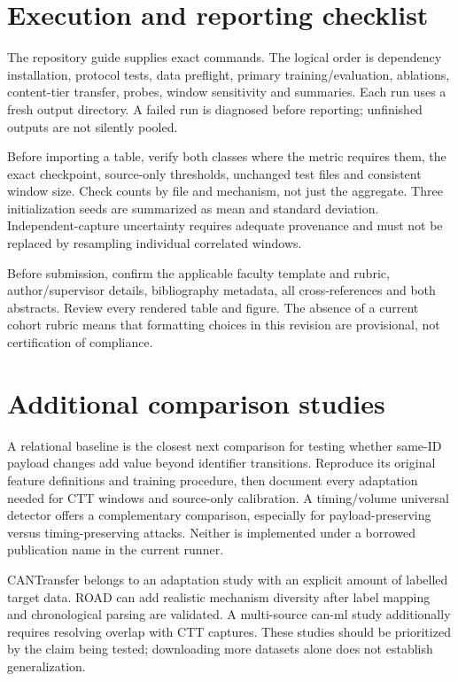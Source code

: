 \documentclass[12pt,a4paper,oneside,openany]{extbook}
\begin{document}
\section{Execution and reporting checklist}
The repository guide supplies exact commands. The logical order is dependency installation, protocol tests, data preflight, primary training/evaluation, ablations, content-tier transfer, probes, window sensitivity and summaries. Each run uses a fresh output directory. A failed run is diagnosed before reporting; unfinished outputs are not silently pooled.

Before importing a table, verify both classes where the metric requires them, the exact checkpoint, source-only thresholds, unchanged test files and consistent window size. Check counts by file and mechanism, not just the aggregate. Three initialization seeds are summarized as mean and standard deviation. Independent-capture uncertainty requires adequate provenance and must not be replaced by resampling individual correlated windows.

Before submission, confirm the applicable faculty template and rubric, author/supervisor details, bibliography metadata, all cross-references and both abstracts. Review every rendered table and figure. The absence of a current cohort rubric means that formatting choices in this revision are provisional, not certification of compliance.

\section{Additional comparison studies}
A relational baseline is the closest next comparison for testing whether same-ID payload changes add value beyond identifier transitions. Reproduce its original feature definitions and training procedure, then document every adaptation needed for CTT windows and source-only calibration. A timing/volume universal detector offers a complementary comparison, especially for payload-preserving versus timing-preserving attacks. Neither is implemented under a borrowed publication name in the current runner.

CANTransfer belongs to an adaptation study with an explicit amount of labelled target data. ROAD can add realistic mechanism diversity after label mapping and chronological parsing are validated. A multi-source can-ml study additionally requires resolving overlap with CTT captures. These studies should be prioritized by the claim being tested; downloading more datasets alone does not establish generalization.

\backmatter{}
\end{document}
